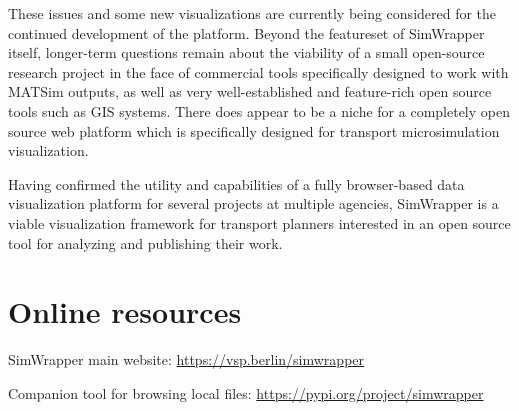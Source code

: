 \documentclass[3p,times,procedia]{elsarticle}
\begin{document}
These issues and some new visualizations are currently being considered for the continued development of the platform. Beyond the featureset of SimWrapper itself, longer-term questions remain about the viability of a small open-source research project in the face of commercial tools specifically designed to work with MATSim outputs, as well as very well-established and feature-rich open source tools such as GIS systems. There does appear to be a niche for a completely open source web platform which is specifically designed for transport microsimulation visualization.

Having confirmed the utility and capabilities of a fully browser-based data visualization platform for several projects at multiple agencies, SimWrapper is a viable visualization framework for transport planners interested in an open source tool for analyzing and publishing their work.

\section{Online resources}

SimWrapper main website: \url{https://vsp.berlin/simwrapper}

Companion tool for browsing local files: \url{https://pypi.org/project/simwrapper}




%
\end{document}
